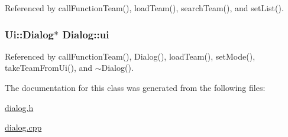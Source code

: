 Referenced by call\+Function\+Team(), load\+Team(), search\+Team(), and set\+List().

\hypertarget{class_dialog_aaa4b5bfb9a0f64900d524f14bc32e6df}{}
\subsubsection[{ui}]{\setlength{\rightskip}{0pt plus 5cm}Ui\+::\+Dialog$\ast$ Dialog\+::ui\hspace{0.3cm}{\ttfamily [private]}}\label{class_dialog_aaa4b5bfb9a0f64900d524f14bc32e6df}


Referenced by call\+Function\+Team(), Dialog(), load\+Team(), set\+Mode(), take\+Team\+From\+Ui(), and $\sim$\+Dialog().



The documentation for this class was generated from the following files\+:\begin{DoxyCompactItemize}
\item 
\hyperlink{dialog_8h}{dialog.\+h}\item 
\hyperlink{dialog_8cpp}{dialog.\+cpp}\end{DoxyCompactItemize}
